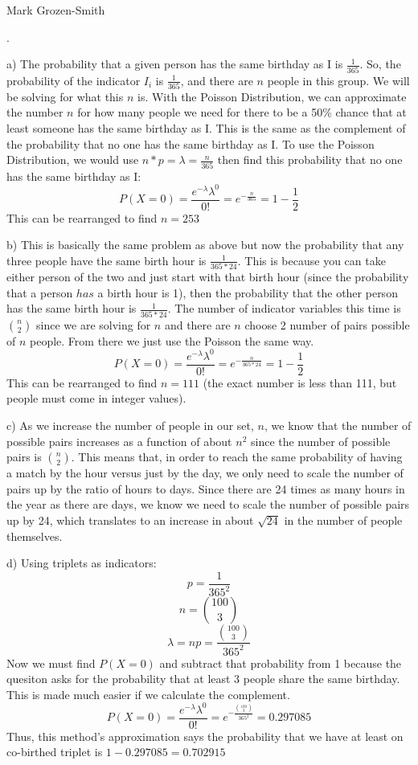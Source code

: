 \documentclass[11pt]{article}
\begin{document}
 \hfill Mark Grozen-Smith

\bigskip

.

	a) The probability that a given person has the same birthday as I is $\frac{1}{365}$.  So, the probability of the indicator $I_i$ is $\frac{1}{365}$, and there are $n$ people in this group.  We will be solving for what this $n$ is.  
	With the Poisson Distribution, we can approximate the number $n$ for how many people we need for there to be a 50\% chance that at least someone has the same birthday as I.  This is the same as the complement of the probability that no one has the same birthday as I.  To use the Poisson Distribution, we would use $n*p = \lambda = \frac{n}{365}$ then find this probability that no one has the same birthday as I: 
	$$ P(X=0) = \frac{e^{-\lambda}\lambda^0}{0!} = e^{-\frac{n}{365}} = 1-\frac{1}{2}$$
	This can be rearranged to find $\boxed{n=253}$

\smallskip
	b) This is basically the same problem as above but now the probability that any three people have the same birth hour is $\frac{1}{365*24}$.  This is because you can take either person of the two and just start with that birth hour (since the probability that a person $has$ a birth hour is 1), then the probability that the other person has the same birth hour is $\frac{1}{365*24}$.  The number of indicator variables this time is $\binom{n}{2}$ since we are solving for $n$ and there are $n$ choose 2 number of pairs possible of $n$ people.  From there we just use the Poisson the same way.  
	$$ P(X=0) = \frac{e^{-\lambda}\lambda^0}{0!} = e^{-\frac{n}{365*24}} = 1-\frac{1}{2}$$
	This can be rearranged to find $\boxed{n=111}$ (the exact number is less than 111, but people must come in integer values).  

\smallskip
	c) As we increase the number of people in our set, $n$, we know that the number of possible pairs increases as a function of about $n^2$ since the number of possible pairs is $\binom{n}{2} $.  This means that, in order to reach the same probability of having a match by the hour versus just by the day, we only need to scale the number of pairs up by the ratio of hours to days. Since there are 24 times as many hours in the year as there are days, we know we need to scale the number of possible pairs up by 24, which translates to an increase in about $\sqrt{24}$ in the number of people themselves.

\smallskip
	d) Using triplets as indicators:
		$$ p = \frac{1}{365^2}$$
		$$ n = \binom{100}{3} $$
		$$ \lambda = np = \frac{\binom{100}{3}}{365^2} $$
		Now we must find $P(X=0)$ and subtract that probability from 1 because the quesiton asks for the probability that at least 3 people share the same birthday.  This is made much easier if we calculate the complement.  
		$$ P(X=0) =  \frac{e^{-\lambda}\lambda^0}{0!} = e^{-\frac{\binom{100}{3}}{365^2}} = 0.297085$$
		Thus, this method's approximation says the probability that we have at least on co-birthed triplet is $1-0.297085 = \boxed{0.702915}$
\end{document}
